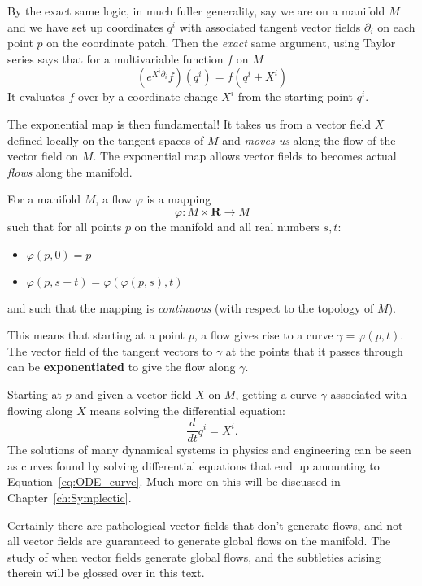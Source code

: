		By the exact same logic, in much fuller generality, say we are on a manifold $M$ and we have set up coordinates $q^i$ with associated tangent vector fields $\partial_i$ on each point $p$ on the coordinate patch. Then the \emph{exact} same argument, using Taylor series says that for a multivariable function $f$ on $M$
		\begin{equation}
			(e^{X^i \partial_i} f)(q^i) = f(q^i + X^i)
		\end{equation}
		It evaluates $f$ over by a coordinate change $X^i$ from the starting point $q^i$.
		
		The exponential map is then fundamental! It takes us from a vector field $X$ defined locally on the tangent spaces of $M$ and \emph{moves us} along the flow of the vector field on $M$. The exponential map allows vector fields to becomes actual \emph{flows} along the manifold. 
		\begin{defn}
			For a manifold $M$, a flow $\varphi$ is a mapping
			\begin{equation}
				\varphi: M \times \mathbf R \rightarrow M
			\end{equation}
			such that for all points $p$ on the manifold and all real numbers $s,t$:
			\begin{itemize}
				\item $\varphi(p,0) = p$
				\item $\varphi(p,s+t) = \varphi(\varphi(p,s),t)$
			\end{itemize}
			and such that the mapping is \emph{continuous} (with respect to the topology of $M$).
		\end{defn}
		This means that starting at a point $p$, a flow gives rise to a curve $\gamma = \varphi(p,t)$. The vector field of the tangent vectors to $\gamma$ at the points that it passes through can be \textbf{exponentiated} to give the flow along $\gamma$.
		
		Starting at $p$ and given a vector field $X$ on $M$, getting a curve $\gamma$ associated with flowing along $X$ means solving the differential equation:
		\begin{equation}\label{eq:ODE_curve}
			\frac{d}{dt} q^i = X^i.
		\end{equation}
		The solutions of many dynamical systems in physics and engineering can be seen as curves found by solving differential equations that end up amounting to  Equation~\eqref{eq:ODE_curve}. Much more on this will be discussed in Chapter~\ref{ch:Symplectic}. 
		
		\begin{nb}
			Certainly there are pathological vector fields that don't generate flows, and not all vector fields are guaranteed to generate global flows on the manifold. The study of when vector fields generate global flows, and the subtleties arising therein will be glossed over in this text.
		\end{nb}
		
